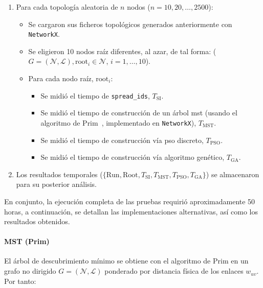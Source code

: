 \begin{enumerate}
  \item Para cada topología aleatoria de \(n\) nodos (\(n = 10,20,\dots,2500\)):
    
    \begin{itemize}
      
      \item Se cargaron sus ficheros topológicos generados anteriormente con \texttt{NetworkX}.
      
      \item Se eligieron 10 nodos raíz diferentes, al azar, de tal forma: (\(G=(\mathcal{N}, \mathcal{L}) , \mathrm{root}_i\in \mathcal{N}\), \(i=1,\dots,10\)).
      
      \item Para cada nodo raíz, \(\mathrm{root}_i\):
      
        \begin{itemize}
        
          \item Se midió el tiempo de \texttt{spread\_ids}, \(T_{\mathrm{SI}}\).
          
          \item Se midió el tiempo de construcción de un árbol \gls{mst} (usando el algoritmo de Prim~\cite{prim}, implementado en \texttt{NetworkX}), \(T_{\mathrm{MST}}\).
          
          \item Se midió el tiempo de construcción vía \gls{pso} discreto, \(T_{\mathrm{PSO}}\).
          
          \item Se midió el tiempo de construcción vía algoritmo genético, \(T_{\mathrm{GA}}\).
        \end{itemize}
    \end{itemize}
    
  \item Los resultados temporales (\(\{\mathrm{Run},\mathrm{Root},T_{\mathrm{SI}},T_{\mathrm{MST}},T_{\mathrm{PSO}},T_{\mathrm{GA}}\}\)) se almacenaron para su posterior análisis. 

\end{enumerate}

En conjunto, la ejecución completa de las pruebas requirió aproximadamente 50 horas, a continuación, se detallan las implementaciones alternativas, así como los resultados obtenidos.


\paragraph{MST (Prim)} El árbol de descubrimiento mínimo se obtiene con el algoritmo de Prim en un grafo no dirigido \(G=(\mathcal{N}, \mathcal{L})\) ponderado por distancia física de los enlaces \(w_{uv}\). Por tanto:

